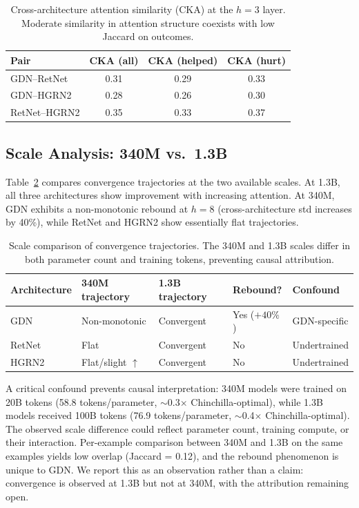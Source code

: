 \documentclass[11pt]{article}
\begin{document}
\begin{table}[t]
\centering
\caption{Cross-architecture attention similarity (CKA) at the $h=3$ layer. Moderate similarity in attention structure coexists with low Jaccard on outcomes.}
\label{tab:cka}
\begin{tabular}{lccc}
\toprule
Pair & CKA (all) & CKA (helped) & CKA (hurt) \\
\midrule
GDN--RetNet & 0.31 & 0.29 & 0.33 \\
GDN--HGRN2 & 0.28 & 0.26 & 0.30 \\
RetNet--HGRN2 & 0.35 & 0.33 & 0.37 \\
\bottomrule
\end{tabular}
\end{table}

\subsection{Scale Analysis: 340M vs.\ 1.3B}
\label{sec:scale}

Table~\ref{tab:scale} compares convergence trajectories at the two available scales. At 1.3B, all three architectures show improvement with increasing attention. At 340M, GDN exhibits a non-monotonic rebound at $h = 8$ (cross-architecture std increases by 40\%), while RetNet and HGRN2 show essentially flat trajectories.

\begin{table}[t]
\centering
\caption{Scale comparison of convergence trajectories. The 340M and 1.3B scales differ in both parameter count and training tokens, preventing causal attribution.}
\label{tab:scale}
\begin{tabular}{lllll}
\toprule
Architecture & 340M trajectory & 1.3B trajectory & Rebound? & Confound \\
\midrule
GDN & Non-monotonic & Convergent & Yes ($+40\%$) & GDN-specific \\
RetNet & Flat & Convergent & No & Undertrained \\
HGRN2 & Flat/slight $\uparrow$ & Convergent & No & Undertrained \\
\bottomrule
\end{tabular}
\end{table}

A critical confound prevents causal interpretation: 340M models were trained on 20B tokens (58.8 tokens/parameter, $\sim$0.3$\times$ Chinchilla-optimal), while 1.3B models received 100B tokens (76.9 tokens/parameter, $\sim$0.4$\times$ Chinchilla-optimal). The observed scale difference could reflect parameter count, training compute, or their interaction. Per-example comparison between 340M and 1.3B on the same examples yields low overlap (Jaccard = 0.12), and the rebound phenomenon is unique to GDN. We report this as an observation rather than a claim: convergence is observed at 1.3B but not at 340M, with the attribution remaining open.
\end{document}
